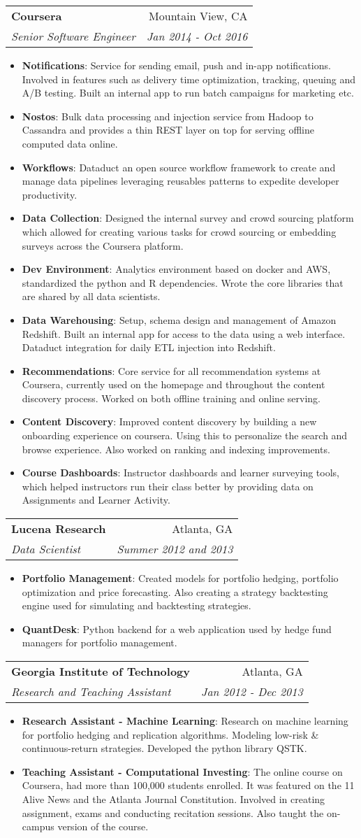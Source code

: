 \documentclass[letterpaper,11pt]{article}
\makeatletter
\newcommand{\resumeItem}[2]{
	\item\small{
		\textbf{#1}{: #2 \vspace{-2pt}}
	}
}
\newcommand{\resumeSubheading}[4]{
	\vspace{-1pt}\item
	\begin{tabular*}{0.97\textwidth}[t]{l@{\extracolsep{\fill}}r}
		\textbf{#1} & #2 \\
		\textit{\small#3} & \textit{\small #4} \\
	\end{tabular*}\vspace{-5pt}
}
\newcommand{\resumeItemListStart}{\begin{itemize}}
\newcommand{\resumeItemListEnd}{\end{itemize}\vspace{-5pt}}
\makeatother
\begin{document}
	\resumeSubheading
	{Coursera}{Mountain View, CA}
	{Senior Software Engineer}{Jan 2014 - Oct 2016}
	\resumeItemListStart
	\resumeItem{Notifications}
	{Service for sending email, push and in-app notifications. Involved in features such as delivery time optimization, tracking, queuing and A/B testing. Built an internal app to run batch campaigns for marketing etc.}
	\resumeItem{Nostos}
	{Bulk data processing and injection service from Hadoop to Cassandra and provides a thin REST layer on top for serving offline computed data online.}
	\resumeItem{Workflows}
	{Dataduct an open source workflow framework to create and manage data pipelines leveraging reusables patterns to expedite developer productivity.}
	\resumeItem{Data Collection}
	{Designed the internal survey and crowd sourcing platform which allowed for creating various tasks for crowd sourcing or embedding surveys across the Coursera platform.}
	\resumeItem{Dev Environment}
	{Analytics environment based on docker and AWS, standardized the python and R dependencies. Wrote the core libraries that are shared by all data scientists.}
	\resumeItem{Data Warehousing}
	{Setup, schema design and management of Amazon Redshift. Built an internal app for access to the data using a web interface. Dataduct integration for daily ETL injection into Redshift.}
	\resumeItem{Recommendations}
	{Core service for all recommendation systems at Coursera, currently used on the homepage and throughout the content discovery process. Worked on both offline training and online serving.}
	\resumeItem{Content Discovery}
	{Improved content discovery by building a new onboarding experience on coursera. Using this to personalize the search and browse experience. Also worked on ranking and indexing improvements.}
	\resumeItem{Course Dashboards}
	{Instructor dashboards and learner surveying tools, which helped instructors run their class better by providing data on Assignments and Learner Activity.}
	\resumeItemListEnd
	
	\resumeSubheading
	{Lucena Research}{Atlanta, GA}
	{Data Scientist}{Summer 2012 and 2013}
	\resumeItemListStart
	\resumeItem{Portfolio Management}
	{Created models for portfolio hedging,  portfolio optimization and price forecasting. Also creating a strategy backtesting engine used for simulating and backtesting strategies.}
	\resumeItem{QuantDesk}
	{Python backend for a web application used by hedge fund managers for portfolio management.}
	\resumeItemListEnd
	
	\resumeSubheading
	{Georgia Institute of Technology}{Atlanta, GA}
	{Research and Teaching Assistant}{Jan 2012 - Dec 2013}
	\resumeItemListStart
	\resumeItem{Research Assistant - Machine Learning}
	{Research on machine learning for portfolio hedging and replication algorithms. Modeling low-risk \& continuous-return strategies. Developed the python library QSTK.}
	\resumeItem{Teaching Assistant - Computational Investing}
	{The online course on Coursera, had more than 100,000 students enrolled. It was featured on the 11 Alive News and the Atlanta Journal Constitution. Involved in creating assignment, exams and conducting recitation sessions. Also taught the on-campus version of the course.}
	\resumeItemListEnd
	
\end{document}
